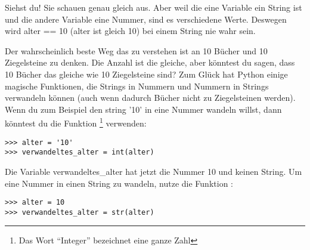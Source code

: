 Siehst du! Sie schauen genau gleich aus. Aber weil die eine Variable ein String ist und die andere Variable eine Nummer, sind es verschiedene Werte. Deswegen wird alter == 10 (alter ist gleich 10) bei einem String nie wahr sein.
\par
Der wahrscheinlich beste Weg das zu verstehen ist an 10 Bücher und 10 Ziegelsteine zu denken. Die Anzahl ist die gleiche, aber könntest du sagen, dass 10 Bücher das gleiche wie 10 Ziegelsteine sind? Zum Glück hat Python einige magische Funktionen, die Strings in Nummern und Nummern in Strings verwandeln können (auch wenn dadurch Bücher nicht zu Ziegelsteinen werden). Wenn du zum Beispiel den string '10' in eine Nummer wandeln willst, dann könntest du die Funktion \footnote{Das Wort ``Integer'' bezeichnet eine ganze Zahl} verwenden:

\begin{Verbatim}[frame=single]
>>> alter = '10'
>>> verwandeltes_alter = int(alter)
\end{Verbatim}

\noindent
Die Variable verwandeltes\_alter hat jetzt die Nummer 10 und keinen String. Um eine Nummer in einen String zu wandeln, nutze die Funktion :

\begin{Verbatim}[frame=single]
>>> alter = 10
>>> verwandeltes_alter = str(alter)
\end{Verbatim}

